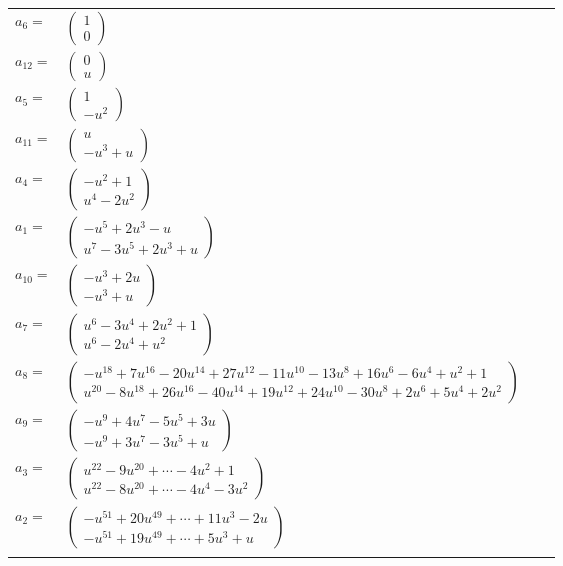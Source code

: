 \documentclass[1p]{elsarticle_modified}
\theoremstyle{definition}
\begin{document}
\begin{tabular}{m{7pt} m{180pt} m{7pt} m{180pt} }
\flushright $a_{6}=$&$\begin{pmatrix}1\\0\end{pmatrix}$ \\
\flushright $a_{12}=$&$\begin{pmatrix}0\\u\end{pmatrix}$ \\
\flushright $a_{5}=$&$\begin{pmatrix}1\\- u^2\end{pmatrix}$ \\
\flushright $a_{11}=$&$\begin{pmatrix}u\\- u^3+u\end{pmatrix}$ \\
\flushright $a_{4}=$&$\begin{pmatrix}- u^2+1\\u^4-2 u^2\end{pmatrix}$ \\
\flushright $a_{1}=$&$\begin{pmatrix}- u^5+2 u^3- u\\u^7-3 u^5+2 u^3+u\end{pmatrix}$ \\
\flushright $a_{10}=$&$\begin{pmatrix}- u^3+2 u\\- u^3+u\end{pmatrix}$ \\
\flushright $a_{7}=$&$\begin{pmatrix}u^6-3 u^4+2 u^2+1\\u^6-2 u^4+u^2\end{pmatrix}$ \\
\flushright $a_{8}=$&$\begin{pmatrix}- u^{18}+7 u^{16}-20 u^{14}+27 u^{12}-11 u^{10}-13 u^8+16 u^6-6 u^4+u^2+1\\u^{20}-8 u^{18}+26 u^{16}-40 u^{14}+19 u^{12}+24 u^{10}-30 u^8+2 u^6+5 u^4+2 u^2\end{pmatrix}$ \\
\flushright $a_{9}=$&$\begin{pmatrix}- u^9+4 u^7-5 u^5+3 u\\- u^9+3 u^7-3 u^5+u\end{pmatrix}$ \\
\flushright $a_{3}=$&$\begin{pmatrix}u^{22}-9 u^{20}+\cdots-4 u^2+1\\u^{22}-8 u^{20}+\cdots-4 u^4-3 u^2\end{pmatrix}$ \\
\flushright $a_{2}=$&$\begin{pmatrix}- u^{51}+20 u^{49}+\cdots+11 u^3-2 u\\- u^{51}+19 u^{49}+\cdots+5 u^3+u\end{pmatrix}$\\&\end{tabular}
\end{document}
